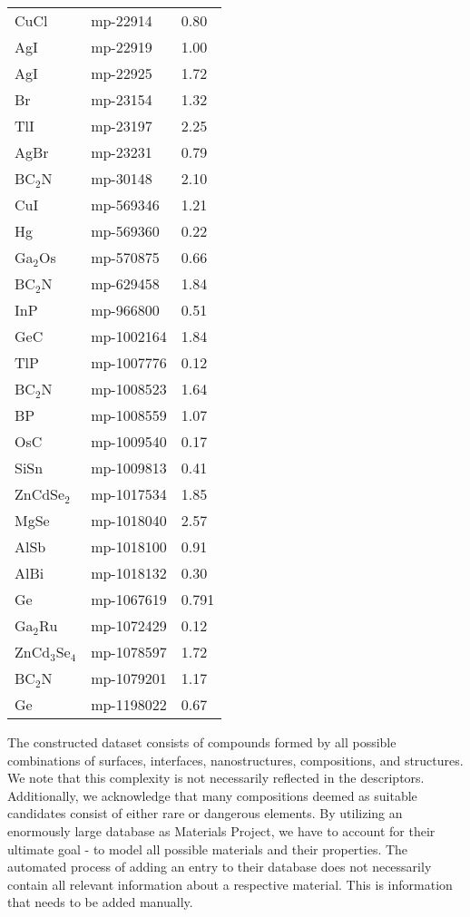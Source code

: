 \begin{center}
\begin{longtable}{M{3.0cm} M{3.0cm} M{3.5cm}}
  CuCl & mp-22914 & 0.80\\
  AgI & mp-22919 & 1.00\\
  AgI & mp-22925 & 1.72\\
  Br & mp-23154 & 1.32\\
  TlI & mp-23197 & 2.25\\
  AgBr & mp-23231 & 0.79\\
  BC$_2$N & mp-30148 & 2.10\\
  CuI & mp-569346 & 1.21\\
  Hg & mp-569360 & 0.22\\
  Ga$_2$Os & mp-570875 & 0.66\\
  BC$_2$N & mp-629458 & 1.84\\
  InP & mp-966800 & 0.51\\
  GeC & mp-1002164 & 1.84\\
  TlP & mp-1007776 & 0.12\\
  BC$_2$N & mp-1008523 & 1.64\\
  BP & mp-1008559 & 1.07\\
  OsC & mp-1009540 & 0.17\\
  SiSn & mp-1009813 & 0.41\\
  ZnCdSe$_2$ & mp-1017534 & 1.85\\
  MgSe & mp-1018040 & 2.57\\
  AlSb & mp-1018100 & 0.91\\
  AlBi & mp-1018132 & 0.30\\
  Ge & mp-1067619 & 0.791\\
  Ga$_2$Ru & mp-1072429 & 0.12\\
  ZnCd$_3$Se$_4$ & mp-1078597 & 1.72\\
  BC$_2$N & mp-1079201 & 1.17\\
  Ge & mp-1198022 & 0.67\\
  \hline
\end{longtable}
\end{center}

The constructed dataset consists of compounds formed by all possible combinations of surfaces, interfaces, nanostructures, compositions, and structures. We note that this complexity is not necessarily reflected in the descriptors. Additionally, we acknowledge that many compositions deemed as suitable candidates consist of either rare or dangerous elements. By utilizing an enormously large database as Materials Project, we have to account for their ultimate goal - to model all possible materials and their properties. The automated process of adding an entry to their database does not necessarily contain all relevant information about a respective material. This is information that needs to be added manually.

